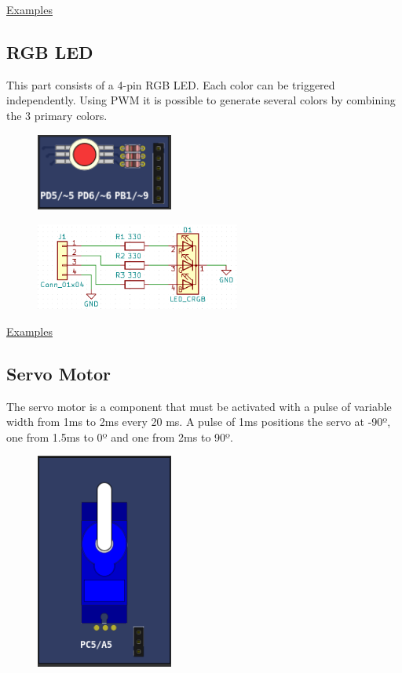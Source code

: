 \href{https://lcgamboa.github.io/picsimlab_examples/examples/examples_index.html\#LEDs}{Examples}
 
\subsection{RGB LED}

This part consists of a 4-pin RGB LED. Each color can be triggered independently.
Using PWM it is possible to generate several colors by combining the 3 primary colors. 
\begin{figure}[H]
\center
\includegraphics[width=0.4\textwidth]{img/part_rgb.png} 
\end{figure} 

\begin{figure}[H]
\center
\includegraphics[width=0.6\textwidth]{img/part_rgb_.png} 
\end{figure} 

\href{https://lcgamboa.github.io/picsimlab_examples/examples/examples_index.html\#RGB_LED}{Examples}

\subsection{Servo Motor}

The servo motor is a component that must be activated with a pulse of variable width from 1ms to 2ms every 20 ms.
A pulse of 1ms positions the servo at -90º, one from 1.5ms to 0º and one from 2ms to 90º.

\begin{figure}[H]
\center
\includegraphics[width=0.4\textwidth]{img/part_servo.png} 
\end{figure} 

